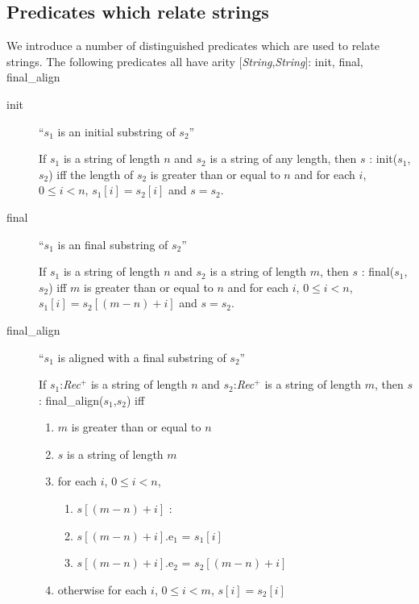 \subsection*{Predicates which relate strings}
\label{app:stringrels}

We introduce a number of distinguished predicates which are used to
relate strings.  The following predicates all have arity
[\textit{String},\textit{String}]: init, final, final\_align
\begin{description}
\item[init] ``$s_1$ is an initial substring of $s_2$''

If $s_1$ is a string of length $n$ and $s_2$ is a string of any
length, then $s$ : init($s_1$,$s_2$) iff the length of $s_2$ is
greater than or equal to $n$ and for each $i$, $0\leq i<n$,
$s_1[i]=s_2[i]$ and $s=s_2$.

\item[final] ``$s_1$ is an final substring of $s_2$''

If $s_1$ is a string of length $n$ and $s_2$ is a string of 
length $m$, then $s$ : final($s_1$,$s_2$) iff $m$ is
greater than or equal to $n$ and for each $i$, $0\leq i<n$,
$s_1[i]=s_2[(m-n)+i]$ and $s=s_2$.

\item[final\_align] ``$s_1$ is aligned with a final substring of
  $s_2$''

If $s_1$:\textit{Rec}$^+$ is a string of length $n$ and $s_2$:\textit{Rec}$^+$ is a string of 
length $m$, then $s$ : final\_align($s_1$,$s_2$) iff 
\begin{enumerate} 
 
\item $m$ is
greater than or equal to $n$ 
 
\item  $s$ is a string of length $m$

\item for each
$i$, $0\leq i<n$, 

\begin{enumerate} 
 
\item  $s[(m-n)+i]$ :
\item  $s[(m-n)+i]$.e$_1$ =
$s_1[i]$

\item $s[(m-n)+i]$.e$_2$ = $s_2[(m-n)+i]$
 
\end{enumerate} 

\item  otherwise for each
$i$, $0\leq i<m$, $s[i]=s_2[i]$ 
 
\end{enumerate} 


\end{description}

